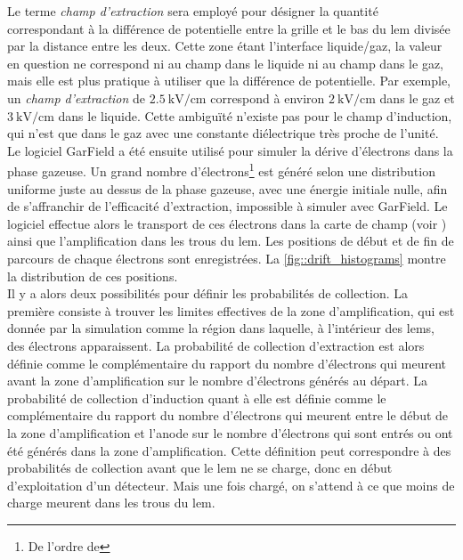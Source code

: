             Le terme \textit{champ d'extraction} sera employé pour désigner la quantité correspondant à la différence de potentielle entre la grille et le bas du \gls{lem} divisée par la distance entre les deux. Cette zone étant l'interface liquide/gaz, la valeur en question ne correspond ni au champ dans le liquide ni au champ dans le gaz, mais elle est plus pratique à utiliser que la différence de potentielle. Par exemple, un \textit{champ d'extraction} de $\SI{2.5}{\kilo\volt\per\centi\meter}$ correspond à environ $\SI{2}{\kilo\volt\per\centi\meter}$ dans le gaz et $\SI{3}{\kilo\volt\per\centi\meter}$ dans le liquide. Cette ambiguïté n'existe pas pour le champ d'induction, qui n'est que dans le gaz avec une constante diélectrique très proche de l'unité.\\
            
            Le logiciel GarField a été ensuite utilisé pour simuler la dérive d'électrons dans la phase gazeuse. Un grand nombre d'électrons\footnote{De l'ordre de } est généré selon une distribution uniforme juste au dessus de la phase gazeuse, avec une énergie initiale nulle, afin de s'affranchir de l'efficacité d'extraction, impossible à simuler avec GarField. Le logiciel effectue alors le transport de ces électrons dans la carte de champ (voir \cite{garfield}) ainsi que l'amplification dans les trous du \gls{lem}. Les positions de début et de fin de parcours de chaque électrons sont enregistrées. La \autoref{fig::drift_histograms} montre la distribution de ces positions.\\
            
            
            Il y a alors deux possibilités pour définir les probabilités de collection. La première consiste à trouver les limites effectives de la zone d'amplification, qui est donnée par la simulation comme la région dans laquelle, à l'intérieur des \glspl{lem}, des électrons apparaissent. La probabilité de collection d'extraction est alors définie comme le complémentaire du rapport du nombre d'électrons qui meurent avant la zone d'amplification sur le nombre d'électrons générés au départ. La probabilité de collection d'induction quant à elle est définie comme le complémentaire du rapport du nombre d'électrons qui meurent entre le début de la zone d'amplification et l'anode sur le nombre d'électrons qui sont entrés ou ont été générés dans la zone d'amplification. Cette définition peut correspondre à des probabilités de collection avant que le \gls{lem} ne se charge, donc en début d'exploitation d'un détecteur. Mais une fois chargé, on s'attend à ce que moins de charge meurent dans les trous du \gls{lem}.\\
            
